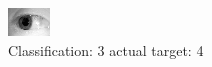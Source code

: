 \begin{figure}[h!]
\begin{center}
\includegraphics[width=0.60\columnwidth]{figures/ID1226_class_3_target_4.png}
\end{center}
\caption{ Classification: 3 actual target: 4}
\label{fig:ID1226_class_3_target_4}
\end{figure}
